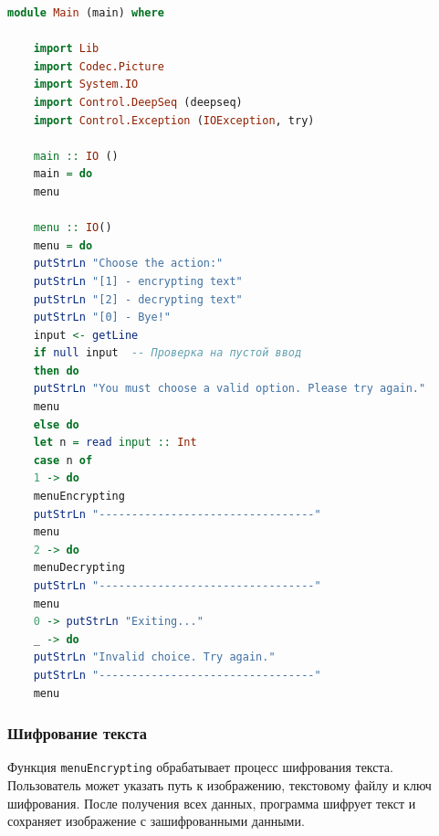\documentclass[10pt,a4paper,final]{article} %
\begin{document}
\begin{lstlisting}[language=Haskell, caption=Основной модуль программы]
	module Main (main) where
	
	import Lib
	import Codec.Picture
	import System.IO
	import Control.DeepSeq (deepseq)
	import Control.Exception (IOException, try)
	
	main :: IO ()
	main = do
	menu
	
	menu :: IO()
	menu = do
	putStrLn "Choose the action:"
	putStrLn "[1] - encrypting text"
	putStrLn "[2] - decrypting text"
	putStrLn "[0] - Bye!"
	input <- getLine
	if null input  -- Проверка на пустой ввод
	then do
	putStrLn "You must choose a valid option. Please try again."
	menu
	else do
	let n = read input :: Int
	case n of    
	1 -> do
	menuEncrypting
	putStrLn "---------------------------------"
	menu
	2 -> do
	menuDecrypting
	putStrLn "---------------------------------"
	menu
	0 -> putStrLn "Exiting..."
	_ -> do
	putStrLn "Invalid choice. Try again."
	putStrLn "---------------------------------"
	menu
\end{lstlisting}

\subsubsection{Шифрование текста}

Функция \texttt{menuEncrypting} обрабатывает процесс шифрования текста. Пользователь может указать путь к изображению, текстовому файлу и ключ шифрования. После получения всех данных, программа шифрует текст и сохраняет изображение с зашифрованными данными.
\end{document}
